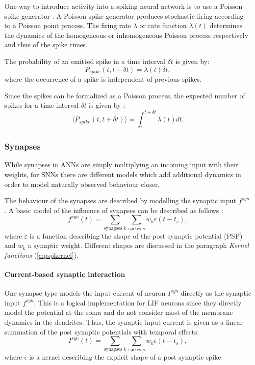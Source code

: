 One way to introduce activity into a spiking neural network is to use a Poisson spike generator \cite{Heeger2000}.
A Poisson spike generator produces stochastic firing according to a Poisson point process.
The firing rate $\lambda$ or rate function $\lambda(t)$ determines the dynamics of the homogeneous or inhomogeneous Poisson process respectively and thus of the spike times.   

The probability of an emitted spike in a time interval $\delta t$ is given by: 
\[
P_{spike}({t , t+ \delta t}) = \lambda(t) \delta t,
\]
where the occurrence of a spike is independent of previous spikes. 

Since the spikes can be formalized as a Poisson process, the expected number of spikes for a time interval $\delta t$ is given by :
\[
\langle  P_{spike}({t , t+ \delta t}) \rangle = \int_t^{t + \delta t} \lambda(t) dt.
\]


\subsubsection{Synapses} \label{c:synapses}

While synapses in ANNs are simply multiplying an incoming input with their weights, for SNNs there are different models which add additional dynamics in order to model naturally observed behaviour closer. 

The behaviour of the synapses are described by modelling the synaptic input $f^{syn}$. A basic model of the influence of synapses can be described as follows \cite{Petrovici2016}:
\[
f^{syn}(t) = \sum_{\text{synapses } k } \sum_{\text{spikes } s} w_k \varepsilon(t - t_s),
\]
where $\varepsilon$ is a function describing the shape of the post synaptic potential (PSP) and $w_k$ a synaptic weight.
Different shapes are discussed in the paragraph \textit{Kernel functions} (\ref{c:pspkernel}).

\paragraph{Current-based synaptic interaction} \label{c:cuba}
One synapse type models the input current of neuron $I^{syn}$ directly as the synaptic input $f^{syn}$. This is a logical implementation for LIF neurons since they directly model the potential at the soma and do not consider most of the membrane dynamics in the dendrites. 
Thus, the synaptic input current is given as a linear summation of the post synaptic potentials with temporal effects:
\[
I^{syn}(t) = \sum_{\text{synapses } k } \sum_{\text{spikes } s} w_k \epsilon(t - t_s),
\]
where $\epsilon$ is a kernel describing the explicit shape of a post synaptic spike.

